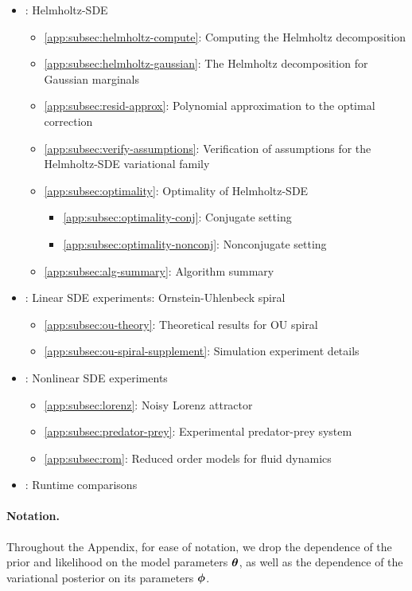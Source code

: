 \begin{itemize}
    \item[~] : Helmholtz-SDE
    \begin{itemize}
        \item \ref{app:subsec:helmholtz-compute}: Computing the Helmholtz decomposition
        \item \ref{app:subsec:helmholtz-gaussian}: The Helmholtz decomposition for Gaussian marginals
        \item \ref{app:subsec:resid-approx}: Polynomial approximation to the optimal correction
        \item \ref{app:subsec:verify-assumptions}: Verification of assumptions for the Helmholtz-SDE variational family
        \item \ref{app:subsec:optimality}: Optimality of Helmholtz-SDE
        \begin{itemize}
            \item \ref{app:subsec:optimality-conj}: Conjugate setting
            \item \ref{app:subsec:optimality-nonconj}: Nonconjugate setting
        \end{itemize}
        \item \ref{app:subsec:alg-summary}: Algorithm summary
    \end{itemize}
    \item[~] : Linear SDE experiments: Ornstein-Uhlenbeck spiral
    \begin{itemize}
        \item \ref{app:subsec:ou-theory}: Theoretical results for OU spiral
        \item \ref{app:subsec:ou-spiral-supplement}: Simulation experiment details
    \end{itemize}
    \item[~] : Nonlinear SDE experiments
    \begin{itemize}
        \item \ref{app:subsec:lorenz}: Noisy Lorenz attractor
        \item \ref{app:subsec:predator-prey}: Experimental predator-prey system
        \item \ref{app:subsec:rom}: Reduced order models for fluid dynamics 
    \end{itemize}
    \item[~] : Runtime comparisons
\end{itemize}

\clearpage

\paragraph{Notation.} 
Throughout the Appendix, for ease of notation, we drop the dependence of the prior and likelihood on the model parameters $\boldsymbol{\theta}$, as well as the dependence of the variational posterior on its parameters $\boldsymbol{\phi}$.





